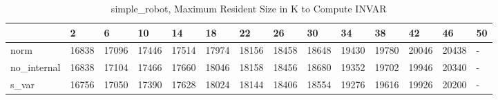 \begin{table}
\caption{simple_robot, Maximum Resident Size in K to Compute INVAR}
\label{simple_robot_INVAR_size}
\begin{tabular}{llllllllllllll}
\toprule
 & 2 & 6 & 10 & 14 & 18 & 22 & 26 & 30 & 34 & 38 & 42 & 46 & 50 \\
\midrule
norm & 16838 & 17096 & 17446 & 17514 & 17974 & 18156 & 18458 & 18648 & 19430 & 19780 & 20046 & 20438 & - \\
no_internal & 16838 & 17104 & 17466 & 17660 & 18046 & 18158 & 18456 & 18680 & 19352 & 19702 & 19946 & 20340 & - \\
s_var & 16756 & 17050 & 17390 & 17628 & 18024 & 18144 & 18406 & 18554 & 19276 & 19616 & 19926 & 20200 & - \\
\bottomrule
\end{tabular}
\end{table}
